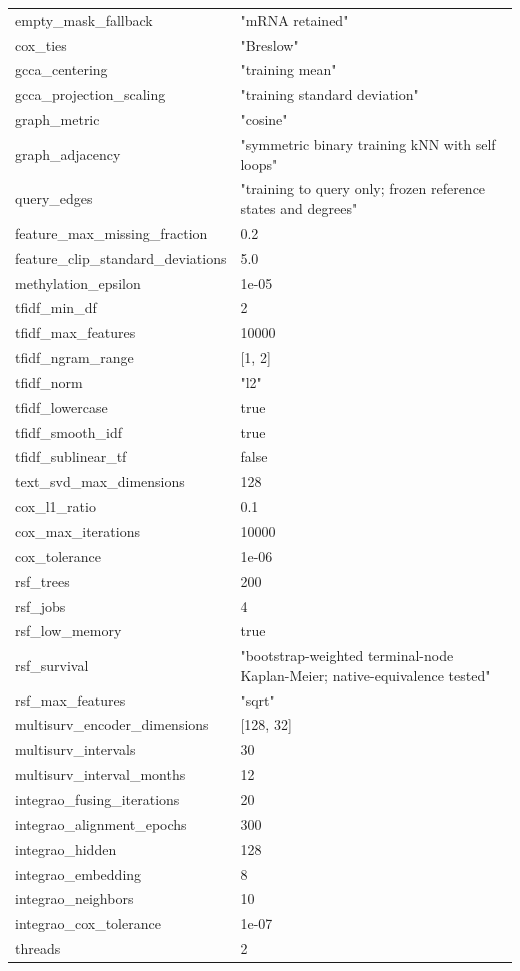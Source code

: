 \documentclass[10pt]{article}
\begin{document}
\begin{longtable}{p{}p{}}
empty\_mask\_fallback & "mRNA retained"\\
cox\_ties & "Breslow"\\
gcca\_centering & "training mean"\\
gcca\_projection\_scaling & "training standard deviation"\\
graph\_metric & "cosine"\\
graph\_adjacency & "symmetric binary training kNN with self loops"\\
query\_edges & "training to query only; frozen reference states and degrees"\\
feature\_max\_missing\_fraction & 0.2\\
feature\_clip\_standard\_deviations & 5.0\\
methylation\_epsilon & 1e-05\\
tfidf\_min\_df & 2\\
tfidf\_max\_features & 10000\\
tfidf\_ngram\_range & [1, 2]\\
tfidf\_norm & "l2"\\
tfidf\_lowercase & true\\
tfidf\_smooth\_idf & true\\
tfidf\_sublinear\_tf & false\\
text\_svd\_max\_dimensions & 128\\
cox\_l1\_ratio & 0.1\\
cox\_max\_iterations & 10000\\
cox\_tolerance & 1e-06\\
rsf\_trees & 200\\
rsf\_jobs & 4\\
rsf\_low\_memory & true\\
rsf\_survival & "bootstrap-weighted terminal-node Kaplan-Meier; native-equivalence tested"\\
rsf\_max\_features & "sqrt"\\
multisurv\_encoder\_dimensions & [128, 32]\\
multisurv\_intervals & 30\\
multisurv\_interval\_months & 12\\
integrao\_fusing\_iterations & 20\\
integrao\_alignment\_epochs & 300\\
integrao\_hidden & 128\\
integrao\_embedding & 8\\
integrao\_neighbors & 10\\
integrao\_cox\_tolerance & 1e-07\\
threads & 2\\
\hline\end{longtable}
\end{document}
